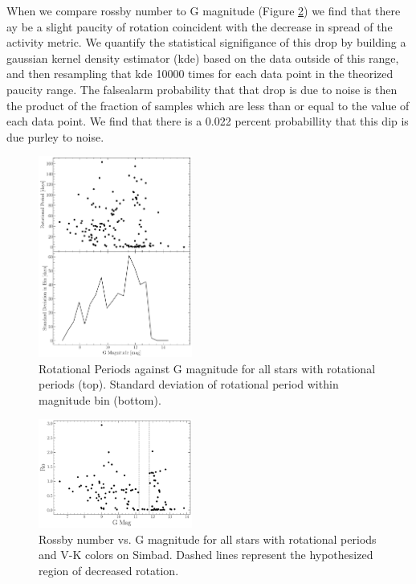 When we compare rossby number to G magnitude (Figure \ref{fig:rossby}) we find
that there ay be a slight paucity of rotation coincident with the decrease in
spread of the activity metric. We quantify the statistical signifigance of this
drop by building a gaussian kernel density estimator (kde) based on the data
outside of this range, and then resampling that kde 10000 times for each data
point in the theorized paucity range. The falsealarm probability that that drop
is due to noise is then the product of the fraction of samples which are less
than or equal to the value of each data point. We find that there is a 0.022
percent probabillity that this dip is due purley to noise.


\begin{figure}
  \centering
  \includegraphics[width=0.45\textwidth]{figures/RotationSignifigance.pdf}
  \caption{Rotational Periods against G magnitude for all stars with rotational
  periods (top). Standard deviation of rotational period within magnitude bin (bottom).}
  \label{fig:rotationalSignifigance}
\end{figure}

\begin{figure}
  \centering
  \includegraphics[width=0.45\textwidth]{figures/Rossby.pdf}
  \caption{Rossby number vs. G magnitude for all stars with rotational periods
  and V-K colors on Simbad. Dashed lines represent the hypothesized region of decreased rotation.}
  \label{fig:rossby}
\end{figure}


